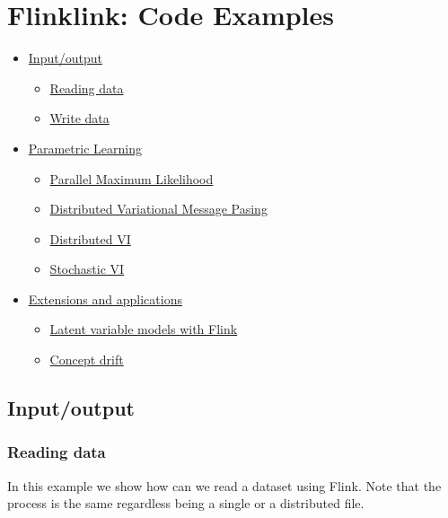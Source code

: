 \documentclass[10pt,a4paper]{article}
\begin{document}
\section{Flinklink: Code Examples}\label{sec:flinklink}

\begin{itemize}
	\item \hyperref[sec:flinklink:io]{Input/output}
	\begin{itemize}
		\item \hyperref[sec:flinklink:io:read]{Reading data}
		\item \hyperref[sec:flinklink:io:write]{Write data}
	\end{itemize}
		\item \hyperref[sec:flinklink:learning]{Parametric Learning}

		
	\begin{itemize}
		\item \hyperref[sec:flinklink:learning:pml]{Parallel Maximum Likelihood}
		\item \hyperref[sec:flinklink:learning:dvmp]{Distributed Variational Message Pasing}
		\item \hyperref[sec:flinklink:learning:dvi]{Distributed VI}
		\item \hyperref[sec:flinklink:learning:svi]{Stochastic VI}
	\end{itemize}
	\item \hyperref[sec:flinklink:ext]{ Extensions and applications}
	\begin{itemize}
			\item \hyperref[sec:flinklink:ext:models]{ Latent variable models with Flink}
			\item \hyperref[sec:flinklink:ext:conceptdrift]{Concept drift}
	\end{itemize}
\end{itemize}


\subsection{Input/output}\label{sec:flinklink:io}




\subsubsection{Reading data}\label{sec:flinklink:io:read}

In this example we show how can we read a dataset using Flink. Note that the process is the same regardless being a single or a distributed file.
\end{document}
